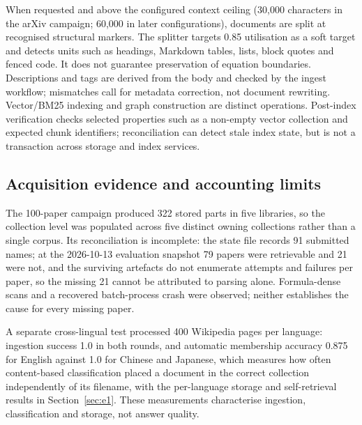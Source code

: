 When requested and above the configured context ceiling (30,000 characters in
the arXiv campaign; 60,000 in later configurations), documents are split at
recognised structural markers. The splitter targets 0.85 utilisation as a
soft target and detects units such as headings, Markdown tables, lists, block
quotes and fenced code. It does not guarantee preservation of equation
boundaries. Descriptions and tags are derived from the body and checked by the
ingest workflow; mismatches call for metadata correction, not document
rewriting.
Vector/BM25 indexing and graph construction are distinct operations.
Post-index verification checks selected properties such as a non-empty vector
collection and expected chunk identifiers; reconciliation can detect stale
index state, but is not a transaction across storage and index services.

\subsection{Acquisition evidence and accounting limits}

The 100-paper campaign produced 322 stored parts in five libraries, so the
collection level was populated across five distinct owning collections rather
than a single corpus.
Its reconciliation is incomplete: the state file records 91 submitted names;
at the 2026-10-13 evaluation snapshot 79 papers were retrievable and 21 were
not, and
the surviving artefacts do not enumerate attempts and failures per paper, so
the missing 21 cannot be attributed to parsing alone. Formula-dense scans and
a recovered batch-process crash were observed; neither establishes the cause
for every missing paper.

A separate cross-lingual test processed 400 Wikipedia pages per language:
ingestion success 1.0 in both rounds, and automatic membership accuracy 0.875
for English against 1.0 for Chinese and Japanese, which measures how often
content-based classification placed a document in the correct collection
independently of its filename, with the per-language storage and
self-retrieval results in Section~\ref{sec:e1}. These measurements
characterise ingestion, classification and storage, not answer quality.
